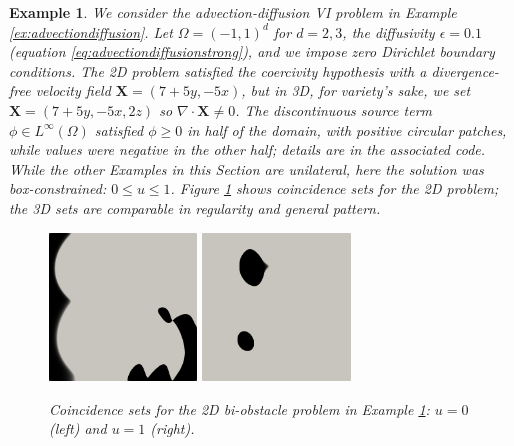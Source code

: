 \documentclass[letterpaper,final,12pt,reqno]{amsart}
\theoremstyle{cstyle}
\theoremstyle{cstyle*}
\theoremstyle{dstyle}
\newtheorem{example}[theorem]{Example}
\numberwithin{equation}{section}
\numberwithin{figure}{section}
\numberwithin{table}{section}
\numberwithin{theorem}{section}
\newcommand{\eps}{\epsilon}
\newcommand{\grad}{\nabla}
\newcommand{\bX}{\mathbf{X}}
\begin{document}
\begin{example}  \label{ex:results:advdiff}
We consider the advection-diffusion VI problem in Example \ref{ex:advectiondiffusion}.  Let $\Omega=(-1,1)^d$ for $d=2,3$, the diffusivity $\eps=0.1$ (equation \eqref{eq:advectiondiffusionstrong}), and we impose zero Dirichlet boundary conditions.  The 2D problem satisfied the coercivity hypothesis with a divergence-free velocity field $\bX = (7+5y,-5x)$, but in 3D, for variety's sake, we set $\bX = (7+5y,-5x,2z)$ so $\grad\cdot\bX \ne 0$.  The discontinuous source term $\phi \in L^\infty(\Omega)$ satisfied $\phi\ge 0$ in half of the domain, with positive circular patches, while values were negative in the other half; details are in the associated code.   While the other Examples in this Section are unilateral, here the solution was box-constrained: $0 \le u \le 1$.  Figure \ref{fig:results:advdiff} shows coincidence sets for the 2D problem; the 3D sets are comparable in regularity and general pattern.

\begin{figure}[ht]
\begin{center}
\includegraphics[width=0.35\textwidth]{fixfigs/poll2d-zero-set.png} \qquad \includegraphics[width=0.35\textwidth]{fixfigs/poll2d-one-set.png}
\end{center}
\caption{Coincidence sets for the 2D bi-obstacle problem in Example \ref{ex:results:advdiff}: $u=0$ (left) and $u=1$ (right).}
\label{fig:results:advdiff}
\end{figure}


\end{example}
\end{document}

